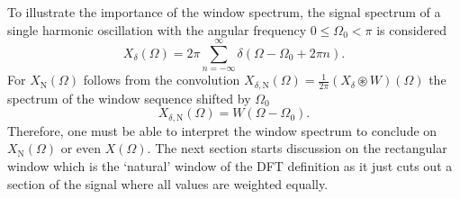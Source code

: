 \documentclass[11pt,a4paper,DIV=12]{scrartcl}
\begin{document}
To illustrate the importance of the window spectrum, the signal spectrum of a
single harmonic oscillation with the angular frequency $0\leq\Omega_0<\pi$
is considered \cite[tab.~2.3, p.~90]{Oppenheim2010}
%
\begin{equation}
X_\delta(\Omega)=2\pi\sum_{n=-\infty}^{\infty}\delta(\Omega-\Omega_0+2\pi n).
\label{eq:DTFTspec_harmSchwingung}
\end{equation}
%
For $X_\text{N}(\Omega)$ follows from the convolution
$X_{\delta,\text{N}}(\Omega)=\frac{1}{2\pi}(X_\delta\circledast W)(\Omega)$
the spectrum of the window sequence shifted by $\Omega_0$
%
\begin{equation}
X_{\delta,\text{N}}(\Omega)=W(\Omega-\Omega_0).
\end{equation}
%
Therefore, one must be able to interpret the window spectrum to conclude on
$X_\text{N}(\Omega)$ or even $X(\Omega)$.
%
The next section starts discussion on the rectangular window which is the
`natural' window of the DFT definition as it just cuts out a section of the
signal where all values are weighted equally.

\end{document}
